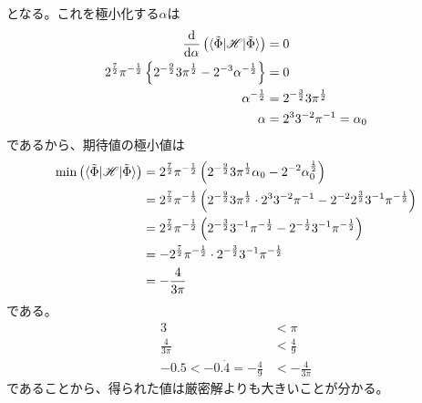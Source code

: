 となる。これを極小化する$\alpha$は
\begin{align}
	\frac{\d}{\d\alpha}\left(
		\braket{\tilde{\Phi}|\mathscr{H}|\tilde{\Phi}}
	\right)
&=
	0 \\
%
%
	2^{\frac{7}{2}} \pi^{-\frac{1}{2}}
		\left\{
			2^{-\frac{9}{2}} 3 \pi^{\frac{1}{2}}
			-
			2^{-3} \alpha^{-\frac{1}{2}}
		\right\}
&=
	0 \\
%
%
	\alpha^{-\frac{1}{2}}
&=
	2^{-\frac{3}{2}} 3 \pi^{\frac{1}{2}} \\
%
%
	\alpha
&=
	2^{3} 3^{-2} \pi^{-1}
=
	\alpha_0
\end{align}
であるから、期待値の極小値は
\begin{align}
	\min\left(
		\braket{\tilde{\Phi}|\mathscr{H}|\tilde{\Phi}}
	\right)
&=
	2^{\frac{7}{2}} \pi^{-\frac{1}{2}}
		\left(
			2^{-\frac{9}{2}} 3 \pi^{\frac{1}{2}} \alpha_0
			-
			2^{-2} \alpha_0^{\frac{1}{2}}
		\right) \\
%
%
&=
	2^{\frac{7}{2}} \pi^{-\frac{1}{2}}
		\left(
			2^{-\frac{9}{2}} 3 \pi^{\frac{1}{2}} \cdot
				2^{3} 3^{-2} \pi^{-1}
			-
			2^{-2} 2^{\frac{3}{2}} 3^{-1} \pi^{-\frac{1}{2}}
		\right) \\
%
%
&=
	2^{\frac{7}{2}} \pi^{-\frac{1}{2}}
		\left(
			2^{-\frac{3}{2}} 3^{-1} \pi^{-\frac{1}{2}}
			-
			2^{-\frac{1}{2}} 3^{-1} \pi^{-\frac{1}{2}}
		\right) \\
%
%
&=
	-
	2^{\frac{7}{2}} \pi^{-\frac{1}{2}} \cdot
		2^{-\frac{3}{2}} 3^{-1} \pi^{-\frac{1}{2}} \\
%
%
&=
	-
	\frac{4}{3\pi}
\end{align}
である。
\begin{align}
	3
&<
	\pi \\
%
%
	\frac{4}{3\pi}
&<
	\frac{4}{9} \\
%
%
	-0.5
<
	-0.\dot{4}
=
	-\frac{4}{9}
&<
	-\frac{4}{3\pi}
\end{align}
であることから、得られた値は厳密解よりも大きいことが分かる。
